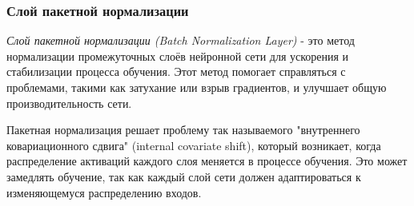 \subsubsection{Слой пакетной нормализации}
\par \textit{Слой пакетной нормализации (Batch Normalization Layer)} - это метод нормализации промежуточных слоёв нейронной сети для ускорения и стабилизации процесса обучения. Этот метод помогает справляться с проблемами, такими как затухание или взрыв градиентов, и улучшает общую производительность сети.
\par Пакетная нормализация решает проблему так называемого "внутреннего ковариационного сдвига" (internal covariate shift), который возникает, когда распределение активаций каждого слоя меняется в процессе обучения. Это может замедлять обучение, так как каждый слой сети должен адаптироваться к изменяющемуся распределению входов.



%
